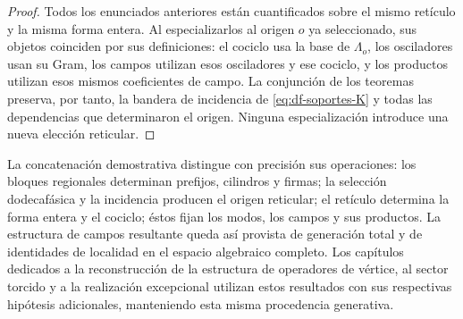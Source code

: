\begin{proof}
Todos los enunciados anteriores están cuantificados sobre el mismo
retículo y la misma forma entera. Al especializarlos al origen
\(o\) ya seleccionado, sus objetos coinciden por sus definiciones:
el cociclo usa la base de \(\Lambda_o\), los osciladores usan su
Gram, los campos utilizan esos osciladores y ese cociclo, y los
productos utilizan esos mismos coeficientes de campo. La conjunción
de los teoremas preserva, por tanto, la bandera de incidencia de
\eqref{eq:df-soportes-K} y todas las dependencias que determinaron
el origen. Ninguna especialización introduce una nueva elección
reticular.
\end{proof}

La concatenación demostrativa distingue con precisión sus operaciones:
los bloques regionales determinan prefijos, cilindros y firmas; la
selección dodecafásica y la incidencia producen el origen reticular;
el retículo determina la forma entera y el cociclo; éstos fijan los
modos, los campos y sus productos. La estructura de campos resultante
queda así provista de generación total y de identidades de localidad
en el espacio algebraico completo. Los capítulos dedicados a la
reconstrucción de la estructura de operadores de vértice, al sector
torcido y a la realización excepcional utilizan estos resultados con
sus respectivas hipótesis adicionales, manteniendo esta misma
procedencia generativa.
